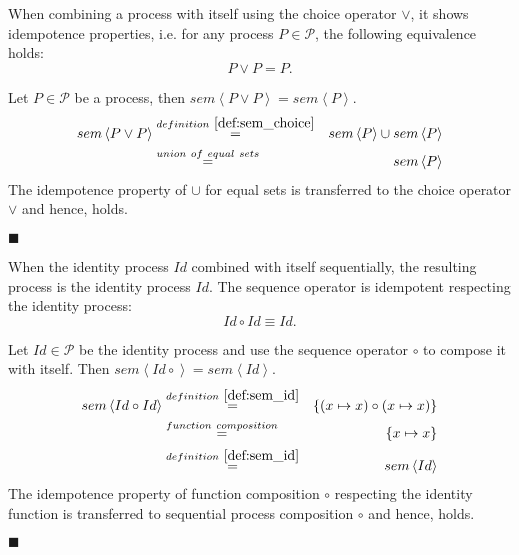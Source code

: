 \begin{theorem}
\label{thm:idempotence_choice}
When combining a process with itself using the choice operator $\vee$, it shows idempotence properties, i.e. for any process $P \in \mathcal{P}$, the following equivalence holds:
\begin{equation*}
  P \vee P = P.
\end{equation*}
\end{theorem}

\begin{myproof}
Let $P \in \mathcal{P}$ be a process, then $sem \left\langle P \vee P \right\rangle = sem \left\langle P \right\rangle$.
\begin{eqnarray*}
  sem \left\langle P \vee P \right\rangle & \overset{\defref{def:sem_choice}}{=} & sem \left\langle P \right\rangle \cup sem \left\langle P \right\rangle \\
  & \overset{union\ of\ equal\ sets}{=} & sem \left\langle P \right\rangle
\end{eqnarray*}
The idempotence property of $\cup$ for equal sets is transferred to the choice operator $\vee$ and hence,  holds.

\hfill$\blacksquare$
\end{myproof}

\begin{theorem}
\label{thm:idempotence_identity}
When the identity process $Id$ combined with itself sequentially, the resulting process is the identity process $Id$. The sequence operator is idempotent respecting the identity process:
\begin{equation*}
  Id \circ Id \equiv Id.
\end{equation*}
\end{theorem}

\begin{myproof}
Let $Id \in \mathcal{P}$ be the identity process and use the sequence operator $\circ$ to compose it with itself. Then $sem \left\langle Id \circ \right\rangle = sem \left\langle Id \right\rangle$.
\begin{eqnarray*}
  sem \left\langle Id \circ Id \right\rangle & \overset{\defref{def:sem_id}}{=} & \left\{ \left( x \mapsto x \right) \circ \left( x \mapsto x \right) \right\} \\
  & \overset{function \ composition}{=} & \left\{ x \mapsto x \right\} \\
  & \overset{\defref{def:sem_id}}{=} & sem \left\langle Id \right\rangle
\end{eqnarray*}
The idempotence property of function composition $\circ$ respecting the identity function is transferred to sequential process composition $\circ$ and hence,  holds.

\hfill$\blacksquare$
\end{myproof}

\begin{myproof}
\end{myproof}

\begin{myproof}
\end{myproof}

